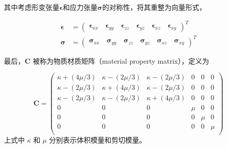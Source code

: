 其中考虑形变张量$\mathbf{\epsilon}$和应力张量$\mathbf{\sigma} $的对称性，将其重整为向量形式，

\begin{equation}
\begin{aligned}
\mathbf{\epsilon} &= \left(
                      \begin{array}{ccccccc}
                         \mathbf{\epsilon}_{xx}\quad
                         \mathbf{\epsilon}_{yy}\quad
                         \mathbf{\epsilon}_{zz}\quad
                         \mathbf{\epsilon}_{yz}\quad
                         \mathbf{\epsilon}_{xz}\quad
                         \mathbf{\epsilon}_{xy}
                      \end{array}
                    \right)^T\\
\mathbf{\sigma} &= \left(
                      \begin{array}{cccccc}
                         \mathbf{\sigma}_{xx}\quad
                         \mathbf{\sigma}_{yy}\quad
                         \mathbf{\sigma}_{zz}\quad
                         \mathbf{\sigma}_{yz}\quad
                         \mathbf{\sigma}_{xz}\quad
                         \mathbf{\sigma}_{xy}
                      \end{array}
                  \right)^T
\end{aligned}
\end{equation}

最后，$\textbf{C}$ 被称为物质材质矩阵（material property matrix），定义为

\begin{equation}
\textbf{C} = \left(
               \begin{array}{cccccc}
                 \kappa + (4\mu/3) & \kappa - (2\mu/3) & \kappa - (2\mu/3) & 0 & 0 & 0 \\
                 \kappa - (2\mu/3) & \kappa + (4\mu/3) & \kappa - (2\mu/3) & 0 & 0 & 0 \\
                 \kappa - (2\mu/3) & \kappa - (2\mu/3) & \kappa + (4\mu/3) & 0 & 0 & 0 \\
                 0 & 0 & 0 & \mu & 0 & 0 \\
                 0 & 0 & 0 & 0 & \mu & 0 \\
                 0 & 0 & 0 & 0 & 0 & \mu \\
               \end{array}
             \right)
\end{equation}
上式中 $\kappa$ 和 $\mu$ 分别表示体积模量和剪切模量。

